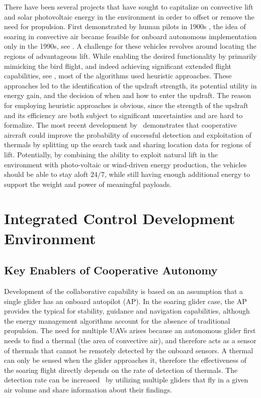 \documentclass[letterpaper, 10 pt, conference]{ieeeconf}  %
\begin{document}
There have been several projects that have sought to capitalize on convective lift and solar photovoltaic energy in the environment in order to offset or remove the need for propulsion. First demonstrated by human pilots in 1900s \cite{Simons:1998}, the idea of soaring in convective air became feasible for onboard autonomous implementation only in the 1990s, see \cite{Wharington:1998}. A challenge for these vehicles revolves around locating the regions of advantageous lift. While enabling the desired functionality by primarily mimicking the bird flight, and indeed achieving significant extended flight capabilities, see \cite{Edwards:2008,Allen:2006,Allen:2007}, most of the algorithms used heuristic approaches. These approaches led to the identification of the updraft strength, its potential utility in energy gain, and the decision of when and how to enter the updraft. The reason for employing heuristic approaches is obvious, since the strength of the updraft and its efficiency are both subject to significant uncertainties and are hard to formalize. The most recent development by~\cite{AKlass_CDC:2012,AKlass_JGCD:2012} demonstrates that cooperative aircraft could improve the probability of successful detection and exploitation of thermals by splitting up the search task and sharing location data for regions of lift. Potentially, by combining the ability to exploit natural lift in the environment with photo-voltaic or wind-driven energy production, the vehicles should be able to stay aloft $24/7$, while still having enough additional energy to support the weight and power of meaningful payloads.


\section{Integrated Control Development Environment}

\subsection{Key Enablers of Cooperative Autonomy}

Development of the collaborative capability is based on an assumption that a single glider has an onboard autopilot (AP). In the soaring glider case, the AP provides the typical for stability, guidance and navigation capabilities, although the energy management algorithms account for the absence of traditional propulsion. The need for multiple UAVs arises because an autonomous glider first needs to find a thermal (the area of convective air), and therefore acts as a sensor of thermals that cannot be remotely detected by the onboard sensors. A thermal can only be sensed when the glider approaches it, therefore the effectiveness of the soaring flight directly depends on the rate of detection of thermals. The detection rate can be increased~\cite{AKlass_JGCD:2012} by utilizing multiple gliders that fly in a given air volume and share information about their findings.
\end{document}
